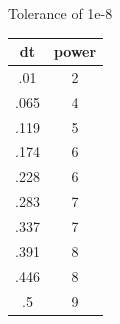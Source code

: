 \documentclass[12 pt, oneside]{article}
\theoremstyle{definition}
\theoremstyle{definition}
\theoremstyle{definition}
\begin{document}
Tolerance of 1e-8
\begin{center}
  \begin{tabular}{|c|c|}
\hline
    dt & power\\
\hline
.01  &  2\\
.065 &   4\\
.119&   5\\
.174&  6\\
.228&  6\\
.283&   7\\
.337&   7\\
.391&   8\\
.446&   8\\
.5&     9\\
\hline
  \end{tabular}
\end{center}
\end{document}
